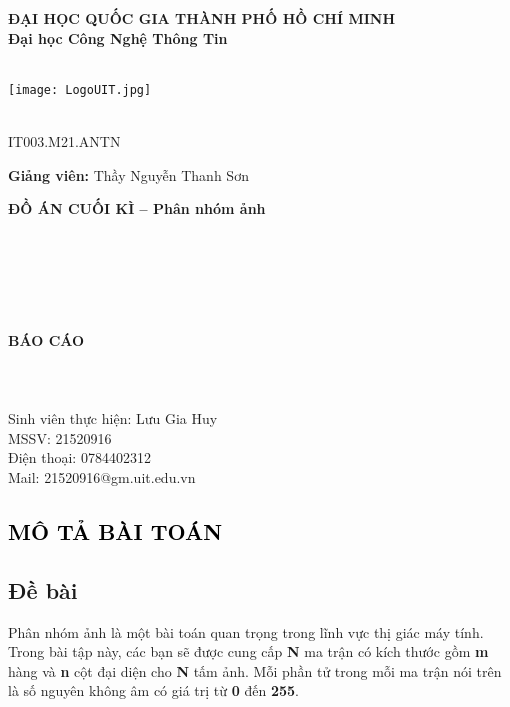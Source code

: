 \documentclass [14pt, a4paper]{report}
\def \DEPARTEMENT {\textbf{ĐẠI HỌC QUỐC GIA THÀNH PHỐ HỒ CHÍ MINH}}
\def \COURSENUM {\textbf{Đại học Công Nghệ Thông Tin}}
\def \REPORTTITLE {\textbf{BÁO CÁO}}
\begin{document}
\fontsize{24pt}
\pagenumbering{}
    \begin{center}
        \Large{\DEPARTEMENT} \\
        \Large{\COURSENUM\;\;\COURSENAME} \\
       
        \hfill \\
         \graphicspath{ {images/} }
    \texttt{[image: LogoUIT.jpg]}
    
     \hfill \\
    IT003.M21.ANTN
    
    \textbf{Giảng viên:} Thầy Nguyễn Thanh Sơn
    
    \textbf{ĐỒ ÁN CUỐI KÌ – Phân nhóm ảnh }
    
    
    
    
    \hfill \\
    \hfill \\
    \hfill \\
    \hfill \\
    \hfill \\
        \textbf{\LARGE{\REPORTTITLE}}
         \hfill \\
    \hfill \\
    \hfill \\
    \hfill \\
   
        
        
Sinh viên thực hiện: Lưu Gia Huy \\
MSSV: 21520916\\
Điện thoại: 0784402312\\
Mail: 21520916@gm.uit.edu.vn



        
    \end{center}
 \newpage
 \fontsize{13}{18}\selectfont

 \tableofcontents 

\textcolor{black}{
\chapter{MÔ TẢ BÀI TOÁN} }

\section{Đề bài}
\setlength{\parindent}{1cm}
Phân nhóm ảnh là một bài toán quan trọng trong lĩnh vực thị giác máy tính.
Trong bài tập này, các bạn sẽ được cung cấp\textbf{ N} ma trận có kích thước gồm \textbf{m} hàng và \textbf{n} cột đại diện cho \textbf{N} tấm ảnh. Mỗi phần tử trong mỗi ma trận nói trên là số nguyên không âm có giá trị từ\textbf{ 0} đến \textbf{255}. 
\end{document}
